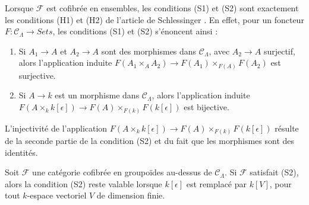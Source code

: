 \begin{remark}
\label{remark-compare-S1-S2-schlessinger}
Lorsque $\mathcal{F}$ est cofibrée en ensembles, les conditions (S1) et (S2)
sont exactement les conditions (H1) et (H2) de l'article de Schlessinger
\cite{Sch}. En effet, pour un foncteur $F: \mathcal{C}_\Lambda \to
\textit{Sets}$, les conditions (S1) et (S2) s'énoncent ainsi :
\begin{enumerate}
\item [(S1)] Si $A_1 \to A$ et $A_2 \to A$ sont des morphismes dans
$\mathcal{C}_\Lambda$, avec $A_2 \to A$ surjectif, alors l'application
induite $F(A_1 \times_A A_2) \to F(A_1) \times_{F(A)} F(A_2)$ est surjective.
\item [(S2)] Si $A \to k$ est un morphisme dans $\mathcal{C}_\Lambda$,
alors l'application induite
$F(A \times_k k[\epsilon]) \to F(A) \times_{F(k)} F(k[\epsilon])$
est bijective.
\end{enumerate}
L'injectivité de l'application
$F(A \times_k k[\epsilon]) \to F(A) \times_{F(k)} F(k[\epsilon])$
résulte de la seconde partie de la condition (S2) et du fait que les
morphismes sont des identités.
\end{remark}

\begin{lemma}
\label{lemma-S2-extensions}
Soit $\mathcal{F}$ une catégorie cofibrée en groupoïdes au-dessus de
$\mathcal{C}_\Lambda$. Si $\mathcal{F}$ satisfait (S2), alors la condition
(S2) reste valable lorsque $k[\epsilon]$ est remplacé par $k[V]$, pour tout
$k$-espace vectoriel $V$ de dimension finie.
\end{lemma}

